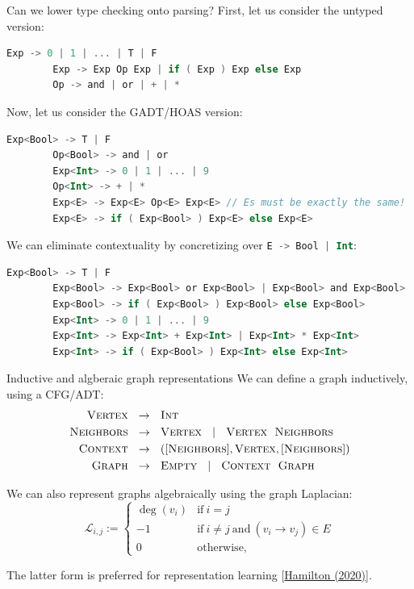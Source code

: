 \documentclass{beamer}
\begin{document}
    \begin{frame}[fragile]{Can we lower type checking onto parsing?}
        First, let us consider the untyped version:
        \begin{lstlisting}[language=Kotlin, gobble=5]
        Exp -> 0 | 1 | ... | T | F
        Exp -> Exp Op Exp | if ( Exp ) Exp else Exp
        Op -> and | or | + | *
        \end{lstlisting}
        Now, let us consider the GADT/HOAS version:
        \begin{lstlisting}[language=Kotlin, gobble=5]
        Exp<Bool> -> T | F
        Op<Bool> -> and | or
        Exp<Int> -> 0 | 1 | ... | 9
        Op<Int> -> + | *
        Exp<E> -> Exp<E> Op<E> Exp<E> // Es must be exactly the same!
        Exp<E> -> if ( Exp<Bool> ) Exp<E> else Exp<E>
        \end{lstlisting}
        We can eliminate contextuality by concretizing over \lstinline[language=Kotlin]{E -> Bool | Int}:
        \begin{lstlisting}[language=Kotlin, gobble=5]
        Exp<Bool> -> T | F
        Exp<Bool> -> Exp<Bool> or Exp<Bool> | Exp<Bool> and Exp<Bool>
        Exp<Bool> -> if ( Exp<Bool> ) Exp<Bool> else Exp<Bool>
        Exp<Int> -> 0 | 1 | ... | 9
        Exp<Int> -> Exp<Int> + Exp<Int> | Exp<Int> * Exp<Int>
        Exp<Int> -> if ( Exp<Bool> ) Exp<Int> else Exp<Int>
        \end{lstlisting}
    \end{frame}

    \begin{frame}[fragile]{Inductive and algberaic graph representations}
        We can define a graph inductively, using a CFG/ADT:
        \begin{align*}
           \textsc{Vertex} &\phantom{\vee}\rightarrow\phantom{\vee} \textsc{Int}\\
           \textsc{Neighbors} &\phantom{\vee}\rightarrow\phantom{\vee} \textsc{Vertex}\phantom{\vee} \mid \phantom{\vee}\textsc{Vertex} \phantom{\vee} \textsc{Neighbors} \\
           \textsc{Context} &\phantom{\vee}\rightarrow\phantom{\vee} ([\textsc{Neighbors}], \textsc{Vertex}, [\textsc{Neighbors}]) \\
           \textsc{Graph} &\phantom{\vee}\rightarrow\phantom{\vee} \textsc{Empty}\phantom{\vee} \mid\phantom{\vee} \textsc{Context} \phantom{\vee} \textsc{Graph}
        \end{align*}

        We can also represent graphs algebraically using the graph Laplacian:
        \[
            \mathcal{L}_{i,j} := \begin{cases}
                             \deg(v_i) & \mbox{if}\ i = j \\
                             -1 & \mbox{if}\ i \neq j\ \mbox{and}\ (v_i \rightarrow v_j) \in E \\
                             0 & \mbox{otherwise},
        \end{cases}\]

        The latter form is preferred for representation learning [\href{https://www.cs.mcgill.ca/~wlh/grl_book/}{Hamilton (2020)}].
    \end{frame}
\end{document}
